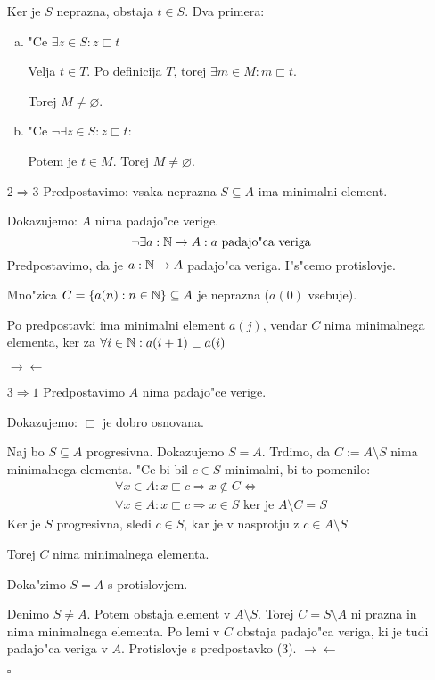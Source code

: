 \begin{itemize}
	Ker je $S$ neprazna, obstaja $t \in S$. Dva primera:
	\begin{enumerate}[(a)]
		\item "Ce $\exists z \in S: z \sqsubset t$
		
		Velja $t \in T$. Po definicija $T$, torej $\exists m \in M: m \sqsubset t$.
		
		Torej $M \neq \varnothing$.
		
		\item "Ce $\lnot \exists z \in S: z \sqsubset t$:
		
		Potem je $t \in M$. Torej $M \neq \varnothing$.
	\end{enumerate}

	\item[$2 \Rightarrow 3$] Predpostavimo: vsaka neprazna $S \subseteq A$ ima minimalni element.
	
	Dokazujemo: $A$ nima padajo"ce verige.
	\begin{equation*}
	\lnot \exists a: \mathbb{N} \to A: \text{$a$ padajo"ca veriga}
	\end{equation*}
	Predpostavimo, da je $a: \mathbb{N} \to A$ padajo"ca veriga. I"s"cemo protislovje.
	
	Mno"zica $C = \{a(n): n \in \mathbb{N}\} \subseteq A$ je neprazna ($a(0)$ vsebuje).
	
	Po predpostavki ima minimalni element $a(j)$, vendar $C$ nima minimalnega elementa, ker za $\forall i \in \mathbb{N}: a(i+1) \sqsubset a(i)$
	
	$\rightarrow \leftarrow$
	
	\item[$3 \Rightarrow 1$] Predpostavimo $A$ nima padajo"ce verige. 
	
	Dokazujemo: $\sqsubset$ je dobro osnovana.
	
	Naj bo $S \subseteq A$ progresivna. Dokazujemo $S = A$. Trdimo, da $C := A \setminus S$ nima minimalnega elementa. "Ce bi bil $c \in S$ minimalni, bi to pomenilo:
	\begin{gather*}
	\forall x \in A: x \sqsubset c \Rightarrow x \notin C \iff \\
	\forall x \in A: x \sqsubset c \Rightarrow x \in S \text{ ker je } A \setminus C = S
	\end{gather*}
	Ker je $S$ progresivna, sledi $c \in S$, kar je v nasprotju z $c \in A \setminus S$.
	
	Torej $C$ nima minimalnega elementa.
	
	Doka"zimo $S = A$ s protislovjem.
	
	Denimo $S \neq A$. Potem obstaja element v $A \setminus S$. Torej $C = S \setminus A$ ni prazna in nima minimalnega elementa. Po lemi v $C$ obstaja padajo"ca veriga, ki je tudi padajo"ca veriga v $A$. Protislovje s predpostavko (3). $\rightarrow \leftarrow$
	
	\hfill $\square$
\end{itemize}
%
